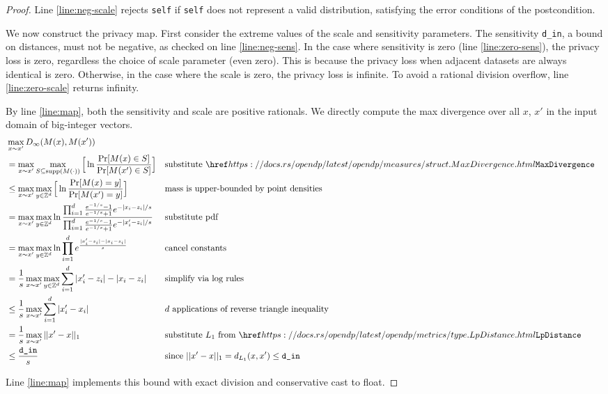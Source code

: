 \documentclass{article}
\begin{document}
\begin{proof}
    Line \ref{line:neg-scale} rejects \texttt{self} if \texttt{self} does not represent a valid distribution,
    satisfying the error conditions of the postcondition.

    We now construct the privacy map.
    First consider the extreme values of the scale and sensitivity parameters.
    The sensitivity \texttt{d\_in}, a bound on distances, must not be negative, as checked on line \ref{line:neg-sens}.
    In the case where sensitivity is zero (line \ref{line:zero-sens}), the privacy loss is zero, regardless the choice of scale parameter (even zero).
    This is because the privacy loss when adjacent datasets are always identical is zero.
    Otherwise, in the case where the scale is zero, the privacy loss is infinite.
    To avoid a rational division overflow, line \ref{line:zero-scale} returns infinity.

    By line \ref{line:map}, both the sensitivity and scale are positive rationals.
    We directly compute the max divergence over all $x$, $x'$ in the input domain of big-integer vectors.
    \begin{align}
        &\max_{x \sim x'} D_\infty(M(x), M(x')) \\
        &=\max_{x \sim x'} \max_{S \subseteq \textrm{supp}(M(\cdot))} \Big[\ln \dfrac{\Pr[M(x) \in S]}{\Pr[M(x') \in S]} \Big]
            &&\text{substitute } \rustdoc{measures/struct}{MaxDivergence} \\
        &\leq\max_{x \sim x'} \max_{y \in \mathbb{Z}^d} \Big[\ln \dfrac{\Pr[M(x) = y]}{\Pr[M(x') = y]} \Big] 
            &&\text{mass is upper-bounded by point densities}\\
        &=\max_{x \sim x'} \max_{y \in \mathbb{Z}^d} \ln \dfrac{\prod_{i=1}^d \frac{e^{-1/s} - 1}{e^{-1/s} + 1} e^{-|x_i - z_i|/s}}{\prod_{i=1}^d\frac{e^{-1/s} - 1}{e^{-1/s} + 1} e^{-|x'_i-z_i|/s}}
            &&\text{substitute pdf}\\
        &=\max_{x \sim x'} \max_{y \in \mathbb{Z}^d} \ln \prod_{i=1}^d e^{\frac{|x'_i - z_i| - |x_i - z_i|}{s}}
            &&\text{cancel constants} \\
        &=\frac{1}{s}\max_{x \sim x'} \max_{y \in \mathbb{Z}^d} \sum_{i=1}^d|x'_i - z_i| - |x_i - z_i| 
            &&\text{simplify via log rules}\\
        &\leq\frac{1}{s}\max_{x \sim x'} \sum_{i=1}^d|x'_i - x_i|
            &&d \text{ applications of reverse triangle inequality} \\
        &=\frac{1}{s}\max_{x \sim x'}||x' - x||_1
            &&\text{substitute } L_1 \text{ from } \rustdoc{metrics/type}{LpDistance} \\
        &\leq\frac{\texttt{d\_in}}{s}
            &&\text{since } ||x' - x||_1 = d_{L_1}(x, x') \leq \texttt{d\_in} \\
    \end{align}

    Line \ref{line:map} implements this bound with exact division and conservative cast to float.
\end{proof}
\end{document}
